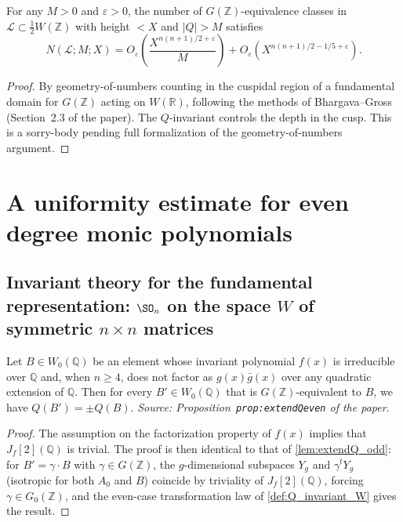 \begin{theorem}
  \label{thm:tail_weak_odd}
  For any \(M>0\) and \(\varepsilon>0\), the number of
  \(G(\mathbb{Z})\)-equivalence classes in
  \(\mathcal{L}\subset\tfrac12 W(\mathbb{Z})\) with height \(<X\)
  and \(|Q|>M\) satisfies
  \[
    N(\mathcal{L};M;X)
    = O_\varepsilon\!\left(\frac{X^{n(n+1)/2+\varepsilon}}{M}\right)
    + O_\varepsilon\!\left(X^{n(n+1)/2-1/5+\varepsilon}\right).
  \]
\end{theorem}
\begin{proof}
  By geometry-of-numbers counting in the cuspidal region of a
  fundamental domain for \(G(\mathbb{Z})\) acting on \(W(\mathbb{R})\),
  following the methods of Bhargava--Gross (Section~2.3 of the paper).
  The \(Q\)-invariant controls the depth in the cusp.  This is a
  sorry-body pending full formalization of the geometry-of-numbers
  argument.
\end{proof}

\section{A uniformity estimate for even degree monic polynomials}

\subsection{Invariant theory for the fundamental representation: $\SO_n$ on the space $W$ of symmetric $n\times n$ matrices}

\begin{proposition}
  \label{prop:extendQeven}
  Let \(B\in W_0(\mathbb{Q})\) be an element whose invariant
  polynomial \(f(x)\) is irreducible over \(\mathbb{Q}\) and, when
  \(n\geq 4\), does not factor as \(g(x)\bar{g}(x)\) over any
  quadratic extension of \(\mathbb{Q}\).  Then for every
  \(B'\in W_0(\mathbb{Q})\) that is \(G(\mathbb{Z})\)-equivalent to
  \(B\), we have \(Q(B')=\pm Q(B)\).
  \textit{Source: Proposition~\texttt{prop:extendQeven} of the paper.}
\end{proposition}
\begin{proof}
  The assumption on the factorization property of \(f(x)\) implies
  that \(J_f[2](\mathbb{Q})\) is trivial.  The proof is then identical
  to that of \cref{lem:extendQ_odd}: for \(B'=\gamma\cdot B\) with
  \(\gamma\in G(\mathbb{Z})\), the \(g\)-dimensional subspaces \(Y_g\)
  and \(\gamma^t Y_g\) (isotropic for both \(A_0\) and \(B\)) coincide
  by triviality of \(J_f[2](\mathbb{Q})\), forcing
  \(\gamma\in G_0(\mathbb{Z})\), and the even-case transformation law
  of \cref{def:Q_invariant_W} gives the result.
\end{proof}

